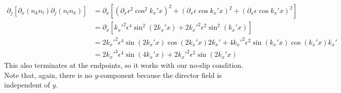 \documentclass[reqno]{article}
\begin{document}
	\begin{equation}
	\begin{split}
		\partial_j \left[ 
		\partial_x \left( n_k n_l \right) 
		\partial_j \left( n_l n_k \right) 
		\right] 
		&= \partial_x
		\left[
		\left( \partial_x \epsilon^2 \cos^2 k_x' x \right)^2
		+ \left( \partial_x \epsilon \cos k_x' x \right)^2
		+ \left( \partial_x \epsilon \cos k_x' x \right)^2
		\right] \\
		&= \partial_x
		\left[
		k_x'^2 \epsilon^4 \sin^2 \left( 2 k_x' x \right)
		+ 2 k_x'^2 \epsilon^2 \sin^2 \left( k_x' x \right) 
		\right] \\
		&= 2 k_x'^2 \epsilon^4 \sin \left( 2 k_x' x \right)
		\cos \left( 2 k_x' x \right) 2 k_x'
		+ 4 k_x'^2 \epsilon^2 \sin \left( k_x' x \right)
		\cos \left( k_x' x \right) k_x' \\
		&= 2 k_x'^3 \epsilon^4 \sin \left( 4 k_x' x \right)
		+ 2 k_x'^2 \epsilon^2 \sin \left( 2 k_x' x \right)
	\end{split}
	\end{equation}
	This also terminates at the endpoints, so it works with our no-slip condition. Note that, again, there is no $y$-component because the director field is independent of $y$. 
	
\end{document}
